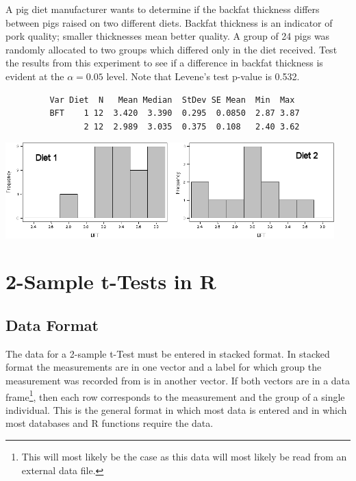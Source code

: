 \documentclass[10pt,openany]{book}\usepackage[]{graphicx}\usepackage[]{color}
\begin{document}
\begin{exsection}
  \item \label{revex:tTestPigBFT} A pig diet manufacturer wants to determine if the backfat thickness differs between pigs raised on two different diets.  Backfat thickness is an indicator of pork quality; smaller thicknesses mean better quality.  A group of 24 pigs was randomly allocated to two groups which differed only in the diet received.  Test the results from this experiment to see if a difference in backfat thickness is evident at the $\alpha=0.05$ level.  Note that Levene's test p-value is 0.532. 
  \begin{Verbatim}
         Var Diet  N   Mean Median  StDev SE Mean  Min  Max
         BFT    1 12  3.420  3.390  0.295  0.0850  2.87 3.87
                2 12  2.989  3.035  0.375  0.108   2.40 3.62
  \end{Verbatim}
  \begin{center}
    \includegraphics[width=5in]{Figs/t2pigbft.png}
  \end{center}

\end{exsection}

\section{2-Sample t-Tests in R}
\subsection{Data Format}
The data for a 2-sample t-Test must be entered in stacked format.  In stacked format the measurements are in one vector and a label for which group the measurement was recorded from is in another vector.  If both vectors are in a data frame\footnote{This will most likely be the case as this data will most likely be read from an external data file.}, then each row corresponds to the measurement and the group of a single individual.  This is the general format in which most data is entered and in which most databases and R functions require the data.
\end{document}
